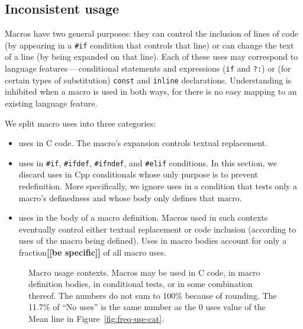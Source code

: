 \documentclass[10pt]{article}
\newcommand{\comment}[1]{\textbf{[[#1]]}}
\newcommand{\pkg}[1]{\textsf{#1}}
\newcommand{\captionsmall}[1]{\caption[]{\small #1}}
\begin{document}


\subsection{Inconsistent usage}
\label{sec:inconsistent-usage}

Macros have two general purposes: they can control the inclusion of lines
of code (by appearing in a \texttt{\#if} condition that controls that line)
or can change the text of a line (by being expanded on that line).  Each of
these uses may correspond to language features\,---\,conditional statements
and expressions (\texttt{if} and {\tt ?:}) or (for certain types of
substitution) {\tt const} and {\tt inline} declarations.  Understanding is
inhibited when a macro is used in both ways, for there is no easy mapping
to an existing language feature.


We split macro uses into three categories:
\begin{itemize}\itemsep 0pt \parskip 0pt
\item uses in C code.   The macro's expansion controls textual
      replacement.
\item uses in \texttt{\#if}, \texttt{\#ifdef}, \texttt{\#ifndef}, and
  \texttt{\#elif} conditions.  In this section, we discard uses in Cpp
  conditionals whose only purpose is to prevent redefinition.  More
  specifically, we ignore uses in a condition that tests only a macro's
  definedness and whose body only defines that macro.
\item uses in the body of a macro definition.
  Macros used in such contexts eventually control either textual
  replacement or code inclusion (according to uses of the macro being
  defined).  Uses in macro bodies account for only a fraction\comment{be specific} of all macro
  uses.
\end{itemize}

\begin{figure}
\centerline{\small
  \setlength{\tabcolsep}{.25em}
}
\captionsmall{Macro usage contexts.  Macros may be used in C code, in
  macro definition bodies, in conditional tests, or in some combination
  thereof.  The numbers do not sum to 100\% because of rounding.  The 11.7\%
  of ``No uses'' is the same number as the 0 uses value of the Mean line in
  Figure~\ref{fig:freq-use-cat}.}
\label{fig:where-used}
\end{figure}
\end{document}
